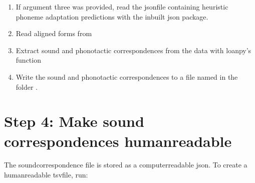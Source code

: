 \documentclass[letterpaper,10pt,english]{sphinxmanual}
\begin{document}

\begin{fulllineitems}
\label{\detokenize{mkloanpy:ronataswestoldturkiccommands.minesc.run}}
\pysigstartsignatures
{}
\pysigstopsignatures\begin{enumerate}
%
\item {} 
\sphinxAtStartPar
If argument three was provided, read the json\sphinxhyphen{}file containing heuristic
phoneme adaptation predictions with the inbuilt json package.

\item {} 
\sphinxAtStartPar
Read aligned forms from 

\item {} 
\sphinxAtStartPar
Extract sound and phonotactic correspondences from the data with
loanpy’s 
function

\item {} 
\sphinxAtStartPar
Write the sound and phonotactic correspondences to a file named
 in the folder .

\end{enumerate}

\end{fulllineitems}



\section{Step 4: Make sound correspondences human\sphinxhyphen{}readable}
\label{\detokenize{mkloanpy:step-4-make-sound-correspondences-human-readable}}
\sphinxAtStartPar
The sound\sphinxhyphen{}correspondence file is stored as a computer\sphinxhyphen{}readable json.
To create a human\sphinxhyphen{}readable tsv\sphinxhyphen{}file, run:
\end{document}
